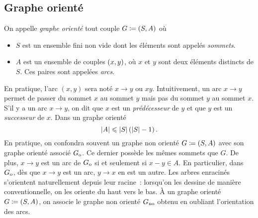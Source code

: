 \documentclass{magnolia}
\begin{document}
\subsection{Graphe orienté}

\begin{definition}
On appelle \emph{graphe orienté} tout couple $G\coloneqq\left(S,A\right)$ où
\begin{itemize}
\item $S$ est un ensemble fini non vide dont les éléments sont appelés
  \emph{sommets}.
\item $A$ est un ensemble de couples $\left(x,y\right)$, où $x$ et $y$ sont deux éléments
  distincts de $S$. Ces paires sont appelées \emph{arcs}.
\end{itemize}
\end{definition}
    
\begin{remarques}
\remarque En pratique, l'arc $(x,y)$ sera noté $x\to y$ ou $xy$. Intuitivement, un arc
  $x\to y$ permet de passer du sommet $x$ au sommet $y$ mais pas
  du sommet $y$ au sommet $x$. S'il y a un arc $x\to y$, on dit que $x$ est un
  \emph{prédécesseur} de $y$ et que $y$ est un \emph{successeur} de $x$.
\remarque Dans un graphe orienté
  \[\left|A\right|\leqslant \left|S\right|\left(\left|S\right|-1\right).\]
\remarque En pratique, on confondra souvent un graphe
  non orienté $G\coloneqq(S, A)$ avec son graphe orienté associé $G_{\rm o}$.
  Ce dernier possède les mêmes sommets que $G$. De plus, $x\to y$ est un arc de $G_{\rm o}$ si et
  seulement si $x-y\in A$. En particulier, dans $G_{\rm o}$,  dès que $x\to y$ est un arc,
  $y\to x$ en est un autre.
\remarque Les arbres enracinés s'orientent naturellement depuis leur racine~: lorsqu'on
  les dessine de manière conventionnelle, on les oriente du haut vers le bas. 
\remarque À un graphe orienté $G\coloneqq(S, A)$, on associe le graphe non orienté
  $G_{\rm no}$ obtenu en \og oubliant \fg l'orientation des arcs.
\end{remarques}
    
\end{document}
